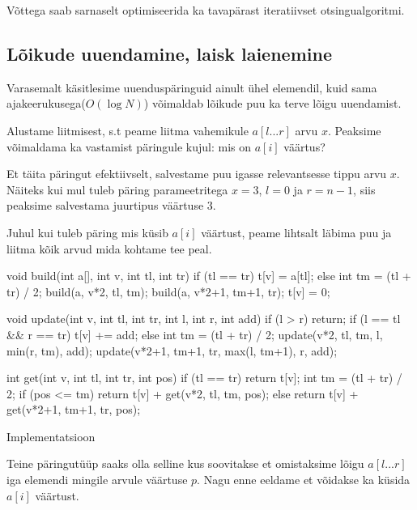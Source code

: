 \documentclass{trkut}
\theoremstyle{definition}
\begin{document}
Võttega saab sarnaselt optimiseerida ka tavapärast iteratiivset otsingualgoritmi. \parencite{brown}

\subsection{Lõikude uuendamine, laisk laienemine}

Varasemalt käsitlesime uuenduspäringuid ainult ühel elemendil, kuid sama ajakeerukusega($O(\log N)$) võimaldab lõikude puu ka terve lõigu uuendamist. \parencite{EMaxx}

Alustame liitmisest, s.t peame liitma vahemikule $a[l...r]$ arvu $x$. Peaksime võimaldama ka vastamist päringule kujul: mis on $a[i]$ väärtus?

Et täita päringut efektiivselt, salvestame puu igasse relevantsesse tippu arvu $x$. Näiteks kui mul tuleb päring parameetritega $x=3$, $l=0$ ja $r=n-1$, siis peaksime salvestama juurtipus väärtuse $3$. \parencite{EMaxx}

Juhul kui tuleb päring mis küsib $a[i]$ väärtust, peame lihtsalt läbima puu ja liitma kõik arvud mida kohtame tee peal. \parencite{EMaxx}
\begin{cclol}
void build(int a[], int v, int tl, int tr) {
    if (tl == tr) {
        t[v] = a[tl];
    } else {
        int tm = (tl + tr) / 2;
        build(a, v*2, tl, tm);
        build(a, v*2+1, tm+1, tr);
        t[v] = 0;
    }
}

void update(int v, int tl, int tr, int l, int r, int add) {
    if (l > r)
        return;
    if (l == tl && r == tr) {
        t[v] += add;
    } else {
        int tm = (tl + tr) / 2;
        update(v*2, tl, tm, l, min(r, tm), add);
        update(v*2+1, tm+1, tr, max(l, tm+1), r, add);
    }
}

int get(int v, int tl, int tr, int pos) {
    if (tl == tr)
        return t[v];
    int tm = (tl + tr) / 2;
    if (pos <= tm)
        return t[v] + get(v*2, tl, tm, pos);
    else
        return t[v] + get(v*2+1, tm+1, tr, pos);
}
\end{cclol}
 \begin{kk}[H]%
    \caption{Implementatsioon}%
    \label{EMaxx}%
    \end{kk}
Teine päringutüüp saaks olla selline kus soovitakse et omistaksime lõigu $a[l...r]$ iga elemendi mingile arvule väärtuse $p$. Nagu enne eeldame et võidakse ka küsida $a[i]$ väärtust. 
\end{document}

